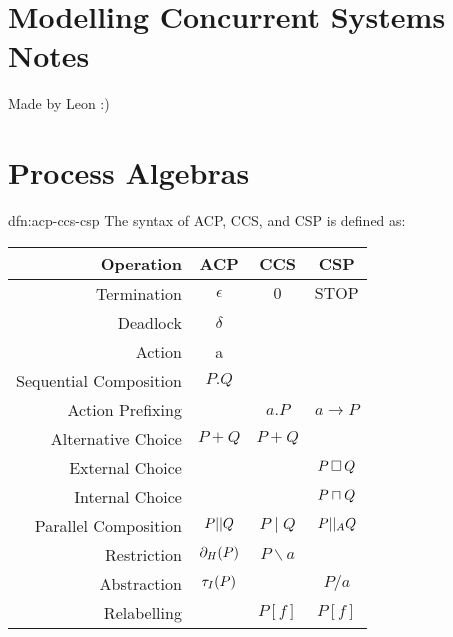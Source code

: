 \documentclass[landscape, 8pt]{extarticle}
\begin{document}
\setlength{\abovedisplayskip}{3.5pt}
\setlength{\belowdisplayskip}{3.5pt}
\setlength{\abovedisplayshortskip}{3.5pt}
\setlength{\belowdisplayshortskip}{3.5pt}

\begin{multicols}{3}
\raggedcolumns


\section*{\huge Modelling Concurrent Systems Notes}
Made by Leon :)


\vspace{-5pt}
\section{Process Algebras}
\setcounter{subsection}{1}

\centering
\begin{dfn}{dfn:acp-ccs-csp}{}
    The syntax of ACP, CCS, and CSP is defined as:
    \begin{tabular}{ |r|c|c|c|}
        \hline
        \textbf{Operation} & \textbf{ACP} & \textbf{CCS} & \textbf{CSP} \\
        \hline
        Termination & $\epsilon$ & $0$ & $\mathrm{STOP}$ \\ 
        \hline
        Deadlock & $\delta$ & &\\
        \hline
        Action & a & &\\
        Sequential Composition & $P.Q$ & & \\
        Action Prefixing &  & $a.P$& $a \to P$\\
        \hline
        Alternative Choice & $P + Q$ & $P + Q$ & \\
        External Choice & & & $P \extchoice Q$ \\
        Internal Choice &  & & $P \intchoice Q$ \\
        \hline
        Parallel Composition & $P \merge Q$ & $P \mid Q$ & $P \pcomp Q$ \\
        \hline
        Restriction & $\restrict(P)$ & $P \backslash a$ & \\
        \hline
        Abstraction & $\abstract(P)$ & & $P / a$ \\
        \hline
        Relabelling & & $P[f]$ & $P[f]$ \\
        \hline

    \end{tabular}


\end{dfn}
\end{multicols}
\end{document}
